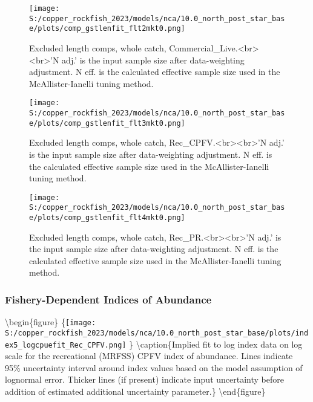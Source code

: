 \documentclass[11pt,
  letterpaper,
]{article}
\begin{document}
\begin{figure}
{\centering
\texttt{[image: S:/copper\_rockfish\_2023/models/nca/10.0\_north\_post\_star\_base/plots/comp\_gstlenfit\_flt2mkt0.png]}
}
\caption{Excluded length comps, whole catch, Commercial_Live.<br><br>'N adj.' is the input sample size after data-weighting adjustment. N eff. is the calculated effective sample size used in the McAllister-Ianelli tuning method.\label{fig:comp_gstlenfit_flt2mkt0}}
\end{figure}

\begin{figure}
{\centering
\texttt{[image: S:/copper\_rockfish\_2023/models/nca/10.0\_north\_post\_star\_base/plots/comp\_gstlenfit\_flt3mkt0.png]}
}
\caption{Excluded length comps, whole catch, Rec_CPFV.<br><br>'N adj.' is the input sample size after data-weighting adjustment. N eff. is the calculated effective sample size used in the McAllister-Ianelli tuning method.\label{fig:comp_gstlenfit_flt3mkt0}}
\end{figure}

\begin{figure}
{\centering
\texttt{[image: S:/copper\_rockfish\_2023/models/nca/10.0\_north\_post\_star\_base/plots/comp\_gstlenfit\_flt4mkt0.png]}
}
\caption{Excluded length comps, whole catch, Rec_PR.<br><br>'N adj.' is the input sample size after data-weighting adjustment. N eff. is the calculated effective sample size used in the McAllister-Ianelli tuning method.\label{fig:comp_gstlenfit_flt4mkt0}}
\end{figure}

\newpage

\subsubsection{Fishery-Dependent Indices of Abundance}\label{fishery-dependent-indices-of-abundance}

\textbackslash begin\{figure\} \{\centering \texttt{[image: S:/copper\_rockfish\_2023/models/nca/10.0\_north\_post\_star\_base/plots/index5\_logcpuefit\_Rec\_CPFV.png]} \} \textbackslash caption\{Implied fit to log index data on log scale for the recreational (MRFSS) CPFV index of abundance. Lines indicate 95\% uncertainty interval around index values based on the model assumption of lognormal error. Thicker lines (if present) indicate input uncertainty before addition of estimated additional uncertainty parameter.\label{fig:mrfss-cpfv-index-fit}\} \textbackslash end\{figure\}
\end{document}
